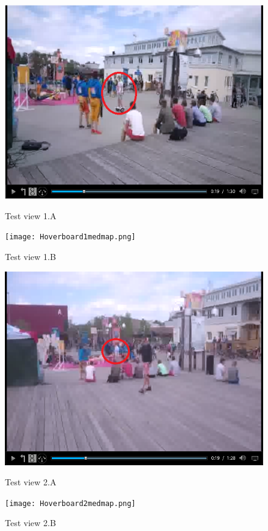 \begin{figure}[!htb]
  \includegraphics[width=\linewidth]{Hoverboard_1.png}
  \caption{Test view 1.A}\label{fig:testview1A}
\endminipage\hfill
\hspace{3px}
  \texttt{[image: Hoverboard1medmap.png]}
  \caption{Test view 1.B}\label{fig:testview1B}
\endminipage\hfill
\end{figure}

\begin{figure}[!htb]
  \includegraphics[width=\linewidth]{Hoverboard_2.png}
  \caption{Test view 2.A}\label{fig:testview2A}
\endminipage\hfill
\hspace{3px}
  \texttt{[image: Hoverboard2medmap.png]}
  \caption{Test view 2.B}\label{fig:testview2B}
\endminipage\hfill
\end{figure}

